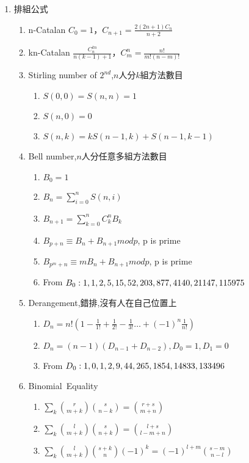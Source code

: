 \begin{enumerate}
\item {排組公式}
\begin{enumerate}
\itemsep = -3pt
\item n-Catalan $C_0 = 1$，$C_{n+1} = \frac{2(2n+1)C_n}{n+2}$
\item kn-Catalan $\frac{C_{n}^{kn}}{n(k-1)+1}$，$C_{m}^{n}=\frac{n!}{m!(n-m)!}$
\item Stirling number of $2^{nd}$,$n$人分$k$組方法數目
	\begin{enumerate}\itemsep = -2pt
		\item $S(0,0)=S(n,n)=1$
		\item $S(n,0)=0$
		\item $S(n,k)=kS(n-1,k)+S(n-1,k-1)$
	\end{enumerate}
\item Bell number,$n$人分任意多組方法數目
	\begin{enumerate}\itemsep = -2pt
		\item $B_0=1$
		\item $B_n=\sum_{i=0}^nS(n,i)$
		\item $B_{n+1}=\sum_{k=0}^{n} C_k^n B_k$
		\item $B_{p+n}\equiv B{_n}+B_{n+1} mod p$, p is prime
		\item $B_{p^m+n}\equiv mB{_n}+B_{n+1} mod p$, p is prime
		\item From $B_0: 1,1,2,5,15,52,\\203,877,4140,21147,115975$
	\end{enumerate}
\item Derangement,錯排,沒有人在自己位置上
	\begin{enumerate}\itemsep = -2pt
		\item $D_n=n!(1-\frac{1}{1!}+\frac{1}{2!}-\frac{1}{3!}\ldots +(-1)^n\frac{1}{n!})$
		\item $D_n=(n-1)(D_{n-1}+D_{n-2}),D_0=1,D_1=0$
		\item From $D_0: 1,0,1,2,9,44,\\265,1854,14833,133496$
	\end{enumerate}
\item Binomial\ Equality
	\begin{enumerate}\itemsep = -2pt
	    \item $\sum_k \binom{r}{m + k} \binom{s}{n - k} = \binom{r + s}{m + n}$
         \item $\sum_k \binom{l}{m + k} \binom{s}{n + k} = \binom{l + s}{l -m + n}$		
         \item $\sum_k \binom{l}{m + k} \binom{s + k}{n}(-1)^k = (-1)^{l + m} \binom{s - m}{n - l}$

\end{enumerate}
\end{enumerate}
\end{enumerate}
